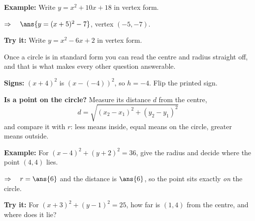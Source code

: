 \documentclass[12pt]{article}
\begin{document}
\begin{examplebox}
\textbf{Example:} \quad Write $y = x^2 + 10x + 18$ in vertex form.

$\Rightarrow\quad \ans{y = (x+5)^2 - 7}$, \quad vertex $(-5, -7)$.
\end{examplebox}

\begin{tryitbox}
\textbf{Try it:} \quad Write $y = x^2 - 6x + 2$ in vertex form.\\[2pt]
\end{tryitbox}


\begin{formulabox}
Once a circle is in standard form you can read the centre and radius straight off, and that is
what makes every other question answerable.\par
\smallskip
\textbf{Signs:} $(x+4)^2$ is $(x-(-4))^2$, so $h = -4$. Flip the printed sign.\par
\smallskip
\textbf{Is a point on the circle?} Measure its distance $d$ from the centre,
\[ d = \sqrt{(x_2-x_1)^2 + (y_2-y_1)^2} \]
and compare it with $r$: less means inside, equal means on the circle, greater means outside.
\end{formulabox}

\begin{examplebox}
\textbf{Example:} \quad For $(x-4)^2 + (y+2)^2 = 36$, give the radius and decide where the point
$(4, 4)$ lies.

$\Rightarrow\quad r = \ans{6}$ and the distance is $\ans{6}$, so the point sits exactly
\emph{on} the circle.
\end{examplebox}

\begin{tryitbox}
\textbf{Try it:} \quad For $(x+3)^2 + (y-1)^2 = 25$, how far is $(1, 4)$ from the centre, and
where does it lie?\\[2pt]
\end{tryitbox}
\end{document}
